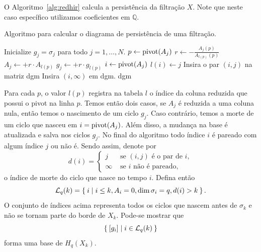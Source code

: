 O Algoritmo~\ref{alg:redhir} calcula a persistência da filtração $X$. Note que neste caso específico
utilizamos coeficientes em $\mathbb{Q}$. 

\begin{algoritmo}[htpb!]
    \caption{Algoritmo para calcular o diagrama de persistência de uma filtração.}
    \label{alg:redhir}
    \begin{algorithmic}[1]
            \State Inicialize $g_j = \sigma_j$ para todo $j=1,\dots,N$.
                    \State $p \leftarrow \text{pivot}(A_j)$
                    \State $r \leftarrow -\frac{A_j(p)}{A_{l(p)}(p)}$
                    \State $A_j \leftarrow + r \cdot A_{l(p)}$
                    \State $g_j \leftarrow + r \cdot g_{l(p)}$
                \EndWhile
                    \State $i \leftarrow \text{pivot}(A_j)$
                    \State $l(i) \leftarrow j$ 
                    \State Insira o par $(i,j)$ na matriz dgm
                \EndIf
            \EndFor
                \State Insira $(i, \infty)$ em dgm. 
            \EndFor
            \State \Return dgm     
        \EndProcedure 
    \end{algorithmic}
\end{algoritmo}

Para cada $p$, o valor $l(p)$ registra na tabela $l$ o índice da coluna reduzida que possui o pivot na linha $p$.  
Temos então dois casos, se $A_j$ é reduzida a uma coluna nula, então temos o nascimento de um ciclo $g_j$. 
Caso contrário, temos a morte de um ciclo que nasceu em $i = \text{pivot}(A_j)$. Além disso, a mudança na base é 
atualizada e salva nos ciclos $g_j$. No final do algoritmo todo índice $i$ é pareado com algum índice $j$ ou 
não é. Sendo assim, denote por 
\begin{equation*}
    d(i) = \left\{
    \begin{array}{cl}
        j      & \text{ se } (i,j) \text{ é o par de } i, \\
        \infty & \text{ se } i \text{ não é pareado}, 
    \end{array}
    \right.
\end{equation*}
o índice de morte do ciclo que nasce no tempo $i$. Defina então
\begin{equation*}
    \mathcal{L}_q(k) = \Set{i | i \leq k, A_i = 0, \dim\sigma_i = q, d(i) > k}.
\end{equation*}
O conjunto de índices acima representa todos os ciclos que nascem antes de $\sigma_k$ e 
não se tornam parte do borde de $X_k$. Pode-se mostrar que 
\begin{equation*}
    \Set{[g_i] | i \in \mathcal{L}_q(k)}
\end{equation*}
forma uma base de $H_q(X_k)$. 

